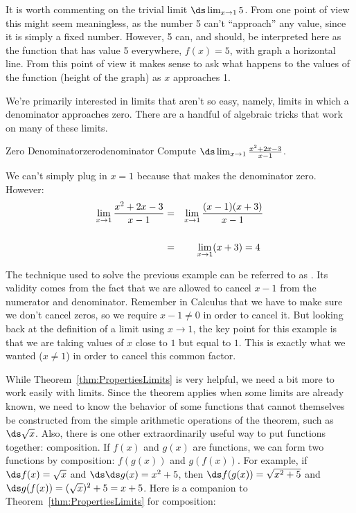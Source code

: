 It is worth commenting on the trivial limit $\ds \lim_{x\to1}5$. From one
point of view this might seem meaningless, as the number 5 can't
``approach'' any value, since it is simply a fixed number. However, 5 can,
and should, be interpreted here as the function that has value 5
everywhere, $f(x)=5$, with graph a horizontal line. From this point of
view it makes sense to ask what happens to the values of the function (height of the graph)
as $x$ approaches 1.

We're primarily interested in limits
that aren't so easy, namely, limits in which a denominator approaches
zero. There are a handful of algebraic tricks that work on many of
these limits.

\begin{example}{Zero Denominator}{zerodenominator}
Compute $\ds\lim_{x\to1}{x^2+2x-3\over x-1}$.
\end{example}

\begin{solution} 
 We can't simply plug in $x=1$ because that makes the denominator
 zero.  However:
\begin{eqnarray*}
\lim_{x\to1}{x^2+2x-3\over x-1}&=&\lim_{x\to1}{(x-1)(x+3)\over x-1}\cr
\\
&=&\lim_{x\to1}(x+3)=4\
\end{eqnarray*}
\end{solution}

The technique used to solve the previous example can be referred to as .
Its validity comes from the fact that we are allowed to cancel $x-1$ from the numerator and denominator.
Remember in Calculus that we have to make sure we don't cancel zeros, so we require $x-1\neq 0$ in order
to cancel it. But looking back at the definition of a limit using $x\to 1$, the key point for this example
is that we are taking values of $x$ close to $1$ but \ifont{not} equal to $1$. This is
exactly what we wanted ($x\neq 1$) in order to cancel this common factor.

While Theorem~\ref{thm:PropertiesLimits} is very helpful, we
need a bit more to work easily with limits. Since the theorem applies
when some limits are already known, we need to know the behavior of
some functions that cannot themselves be constructed from the simple
arithmetic operations of the theorem, such as $\ds\sqrt{x}$. Also,
there is one other extraordinarily useful way to put functions
together: composition. If $f(x)$ and
$g(x)$ are functions, we can form two functions by composition:
$f(g(x))$ and $g(f(x))$. For example, if $\ds f(x)=\sqrt{x}$ and $\ds
\ds g(x)=x^2+5$, then $\ds f(g(x))=\sqrt{x^2+5}$ and $\ds
g(f(x))=(\sqrt{x})^2+5=x+5$.  Here is a companion to
Theorem~\ref{thm:PropertiesLimits} for composition:

